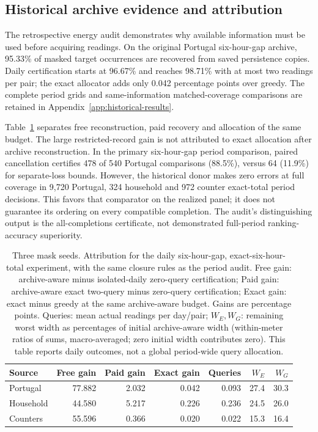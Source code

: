 \documentclass[12pt]{article}
\begin{document}
\subsection{Historical archive evidence and attribution}
The retrospective energy audit demonstrates why available information must
be used before acquiring readings. On the original Portugal six-hour-gap
archive, 95.33\% of masked target occurrences are recovered from saved
persistence copies. Daily certification starts at 96.67\% and reaches
98.71\% with at most two readings per pair; the exact allocator adds only
0.042 percentage points over greedy. The complete period grids and
same-information matched-coverage comparisons are retained in
Appendix~\ref{app:historical-results}.

Table~\ref{tab:recovery-attribution} separates free reconstruction, paid
recovery and allocation of the same budget. The large restricted-record
gain is not attributed to exact allocation after archive reconstruction.
In the primary six-hour-gap period comparison, paired cancellation certifies
478 of 540 Portugal comparisons (88.5\%), versus 64 (11.9\%) for separate-loss
bounds. However, the historical donor makes zero errors at full coverage in
9,720 Portugal, 324 household and 972 counter exact-total period decisions.
This favors that comparator on the realized panel; it does not guarantee
its ordering on every compatible completion. The audit's distinguishing
output is the all-completions certificate, not demonstrated full-period
ranking-accuracy superiority.

\begin{table}[htbp]
\centering\normalsize\setlength{\tabcolsep}{4pt}
\caption{Three mask seeds. Attribution for the daily six-hour-gap, exact-six-hour-total experiment, with the same closure rules as the period audit. Free gain: archive-aware minus isolated-daily zero-query certification; Paid gain: archive-aware exact two-query minus zero-query certification; Exact gain: exact minus greedy at the same archive-aware budget. Gains are percentage points. Queries: mean actual readings per day/pair; $W_E,W_G$: remaining worst width as percentages of initial archive-aware width (within-meter ratios of sums, macro-averaged; zero initial width contributes zero). This table reports daily outcomes, not a global period-wide query allocation.}
\label{tab:recovery-attribution}
\begin{tabular}{lrrrrrr}
\toprule
Source & Free gain & Paid gain & Exact gain & Queries & $W_E$ & $W_G$\\
\midrule
Portugal & 77.882 & 2.032 & 0.042 & 0.093 & 27.4 & 30.3\\
Household & 44.580 & 5.217 & 0.226 & 0.236 & 24.5 & 26.0\\
Counters & 55.596 & 0.366 & 0.020 & 0.022 & 15.3 & 16.4\\
\bottomrule
\end{tabular}
\end{table}
\FloatBarrier
\end{document}

